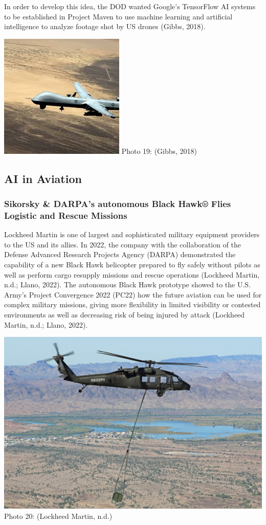 \documentclass[
]{article}
\begin{document}
In order to develop this idea, the DOD wanted Google's TensorFlow AI systems to be established in Project Maven to use machine learning and artificial intelligence to analyze footage shot by US drones (Gibbs, 2018).

\includegraphics{Maven.jpg}
Photo 19: (Gibbs, 2018)

\hypertarget{ai-in-aviation}{%
\subsection{AI in Aviation}\label{ai-in-aviation}}

\hypertarget{sikorsky-darpas-autonomous-black-hawk-flies-logistic-and-rescue-missions}{%
\subsubsection{Sikorsky \& DARPA's autonomous Black Hawk® Flies Logistic and Rescue Missions}\label{sikorsky-darpas-autonomous-black-hawk-flies-logistic-and-rescue-missions}}

Lockheed Martin is one of largest and sophisticated military equipment providers to the US and its allies. In 2022, the company with the collaboration of the Defense Advanced Research Projects Agency (DARPA) demonstrated the capability of a new Black Hawk helicopter prepared to fly safely without pilots as well as perform cargo resupply missions and rescue operations (Lockheed Martin, n.d.; Llano, 2022). The autonomous Black Hawk prototype showed to the U.S. Army's Project Convergence 2022 (PC22) how the future aviation can be used for complex military missions, giving more flexibility in limited visibility or contested environments as well as decreasing risk of being injured by attack (Lockheed Martin, n.d.; Llano, 2022).

\includegraphics{Hawk2.jpg}
Photo 20: (Lockheed Martin, n.d.)
\end{document}
